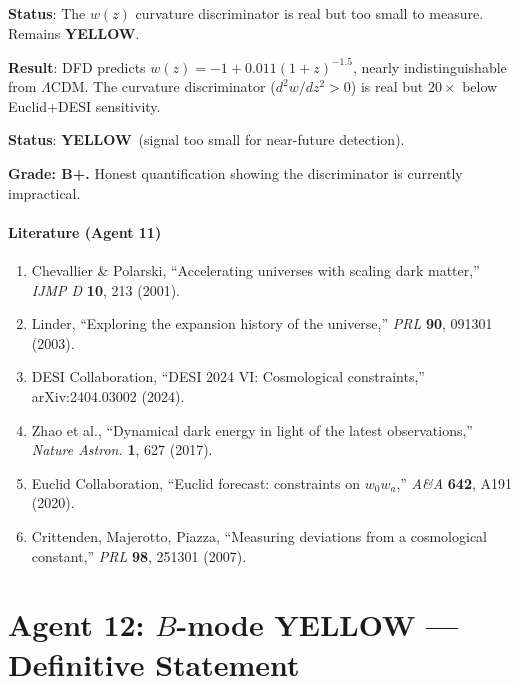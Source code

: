 \documentclass[11pt,a4paper]{article}
\newcommand{\YELLOW}{\textcolor{dfdyellow}{\textbf{YELLOW}}}
\begin{document}
\textbf{Status}: The $w(z)$ curvature discriminator is real but too small to measure. Remains \YELLOW.

\begin{tcolorbox}[colback=yellow!5!white, colframe=yellow!60!black, title={Agent 11: $w(z)$ --- QUANTIFIED but Remains YELLOW}]
\textbf{Result}: DFD predicts $w(z) = -1 + 0.011(1+z)^{-1.5}$, nearly indistinguishable from $\Lambda$CDM. The curvature discriminator ($d^2w/dz^2 > 0$) is real but $20\times$ below Euclid+DESI sensitivity.

\textbf{Status}: \YELLOW\ (signal too small for near-future detection).

\textbf{Grade: B+.} Honest quantification showing the discriminator is currently impractical.
\end{tcolorbox}

\subsection{Literature (Agent 11)}

\begin{enumerate}
\item Chevallier \& Polarski, ``Accelerating universes with scaling dark matter,'' \textit{IJMP D} \textbf{10}, 213 (2001).
\item Linder, ``Exploring the expansion history of the universe,'' \textit{PRL} \textbf{90}, 091301 (2003).
\item DESI Collaboration, ``DESI 2024 VI: Cosmological constraints,'' arXiv:2404.03002 (2024).
\item Zhao et al., ``Dynamical dark energy in light of the latest observations,'' \textit{Nature Astron.} \textbf{1}, 627 (2017).
\item Euclid Collaboration, ``Euclid forecast: constraints on $w_0 w_a$,'' \textit{A\&A} \textbf{642}, A191 (2020).
\item Crittenden, Majerotto, Piazza, ``Measuring deviations from a cosmological constant,'' \textit{PRL} \textbf{98}, 251301 (2007).
\end{enumerate}


\part{Agent 12: $B$-mode YELLOW --- Definitive Statement}
\label{part:bmode}
\end{document}
